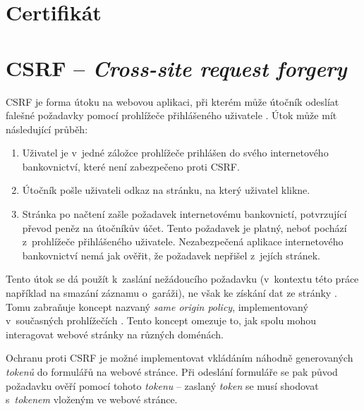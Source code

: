 

\section{Certifikát}


\section{CSRF -- \textit{Cross-site request forgery}}

CSRF je forma útoku na webovou aplikaci, při kterém může útočník odeslíat falešné požadavky pomocí prohlížeče přihlášeného uživatele \cite{csrf_owasp}. Útok může mít následující průběh:

\begin{enumerate}
    \item Uživatel je v~jedné záložce prohlížeče prihlášen do svého internetového bankovnictví, které není zabezpečeno proti CSRF.
    \item Útočník pošle uživateli odkaz na stránku, na který uživatel klikne.
    \item Stránka po načtení zašle požadavek internetovému bankovnictí, potvrzující převod peněz na útočníkův účet. Tento požadavek je platný, neboť pochází z~prohlížeče přihlášeného uživatele. Nezabezpečená aplikace internetového bankovnictví nemá jak ověřit, že požadavek nepřišel z~jejích stránek.
\end{enumerate}

Tento útok se dá použít k~zaslání nežádoucího požadavku (v~kontextu této práce například na smazání záznamu o~garáži), ne však ke získání dat ze stránky \cite{csrf_owasp}. Tomu zabraňuje koncept nazvaný \textit{same origin policy}, implementovaný v~současných prohlížečích \cite{sec_handbook}. Tento koncept omezuje to, jak spolu mohou interagovat webové stránky na různých doménách.

Ochranu proti CSRF je možné implementovat vkládáním náhodně generovaných \textit{tokenů} do formulářů na webové stránce. Při odeslání formuláře se pak původ požadavku ověří pomocí tohoto \textit{tokenu} -- zaslaný \textit{token} se musí shodovat s~\textit{tokenem} vloženým ve webové stránce.

